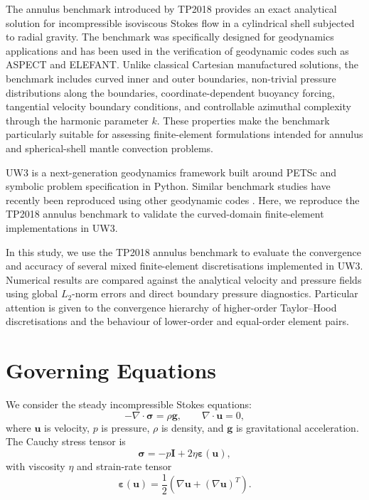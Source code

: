 \documentclass[gmd, manuscript]{copernicus}
\begin{document}
The annulus benchmark introduced by TP2018 provides an exact analytical solution
for incompressible isoviscous Stokes flow in a cylindrical shell subjected to
radial gravity. The benchmark was specifically designed for geodynamics
applications and has been used in the verification of geodynamic codes such as
ASPECT and ELEFANT. Unlike classical Cartesian manufactured solutions, the
benchmark includes curved inner and outer boundaries, non-trivial pressure
distributions along the boundaries, coordinate-dependent buoyancy forcing,
tangential velocity boundary conditions, and controllable azimuthal complexity
through the harmonic parameter \(k\). These properties make the benchmark
particularly suitable for assessing finite-element formulations intended for
annulus and spherical-shell mantle convection problems.

UW3 is a next-generation geodynamics framework built around PETSc and symbolic
problem specification in Python. Similar benchmark studies have recently been reproduced
using other geodynamic codes \citep{gassmoller2024,davies2022}.
Here, we reproduce the TP2018 annulus benchmark to validate the curved-domain
finite-element implementations in UW3.

In this study, we use the TP2018 annulus benchmark to evaluate the convergence
and accuracy of several mixed finite-element discretisations implemented in UW3.
Numerical results are compared against the analytical velocity and pressure
fields using global \(L_2\)-norm errors and direct boundary pressure
diagnostics. Particular attention is given to the convergence hierarchy of
higher-order Taylor--Hood discretisations and the behaviour of lower-order and
equal-order element pairs.

\section{Governing Equations}

We consider the steady incompressible Stokes equations:
\[
  -\nabla \cdot \boldsymbol{\sigma} = \rho \mathbf{g},
  \qquad
  \nabla \cdot \mathbf{u} = 0,
\]
where \(\mathbf{u}\) is velocity, \(p\) is pressure, \(\rho\) is density, and \(\mathbf{g}\) is gravitational acceleration.
The Cauchy stress tensor is
\[
  \boldsymbol{\sigma} = -p\mathbf{I} + 2\eta\boldsymbol{\varepsilon}(\mathbf{u}),
\]
with viscosity \(\eta\) and strain-rate tensor
\[
  \boldsymbol{\varepsilon}(\mathbf{u})
  =
  \frac{1}{2}\left(\nabla \mathbf{u} + (\nabla \mathbf{u})^T\right).
\]
\end{document}

